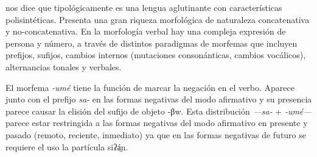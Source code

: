 \textcolor{MidnightBlue}{\citet{chichimeco}} nos dice que tipológicamente es una lengua aglutinante con características polisintéticas. Presenta una gran riqueza morfológica de naturaleza concatenativa y no-concatenativa. En la morfología verbal hay una compleja expresión de persona y número, a través de distintos paradigmas de morfemas que incluyen prefijos, sufijos, cambios internos (mutaciones consonánticas, cambios vocálicos), alternancias tonales y verbales.

El morfema \textit{-umé} tiene la función de marcar la negación en el verbo. Aparece junto con el prefijo \textit{sa-} en las formas negativas del modo afirmativo y su presencia parece causar la elisión del sufijo de objeto {\setmainfont{Doulos SIL}-βw}. Esta distribución \textit{—sa-} + \textit{-umé—} parece estar restringida a las formas negativas del modo afirmativo en presente y pasado (remoto, reciente, inmediato) ya que en las formas negativas de futuro se requiere el uso la partícula {\setmainfont{Doulos SIL}siʔá̤n.}
